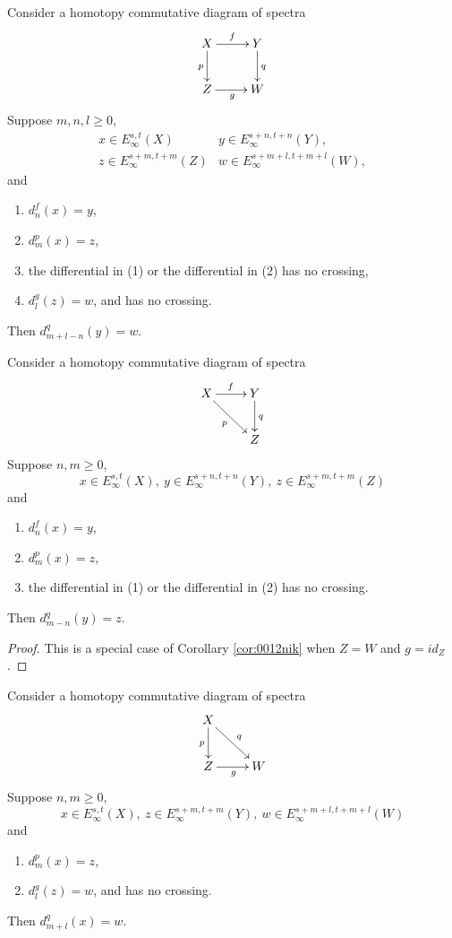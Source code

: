 \documentclass{amsart}
\numberwithin{equation}{section}
\begin{document}
\begin{corollary} \label{cor:0012nik}
    Consider a homotopy commutative diagram of spectra
    $$\xymatrix{
    X \ar[r]^{f}\ar[d]_{p} & Y\ar[d]^{q}\\
    Z \ar[r]_{g} & W
    }$$
    Suppose $m,n,l\ge 0$, 
    $$\begin{array}{ll}
        x\in E^{s,t}_\infty(X) & y\in E^{s+n,t+n}_\infty(Y),\\
        z\in E^{s+m,t+m}_\infty(Z) & w\in E^{s+m+l,t+m+l}_\infty(W),
    \end{array}$$
    and
    \begin{enumerate}
        \item $d^{f}_{n}(x)=y$,
        \item $d^{p}_{m}(x)=z$,
        \item the differential in (1) or the differential in (2) has no crossing,
        \item $d^{g}_{l}(z)=w$, and has no crossing.
    \end{enumerate}
    Then $d^{q}_{m+l-n}(y)=w$.
\end{corollary}

\begin{corollary} \label{cor:166dc180}
    Consider a homotopy commutative diagram of spectra
    $$\xymatrix{
    X \ar[r]^{f}\ar[dr]_{p} & Y\ar[d]^{q}\\
    & Z
    }$$
    Suppose $n,m\ge 0$, 
    $$x\in E^{s,t}_\infty(X), ~y\in E^{s+n,t+n}_\infty(Y), ~z\in E^{s+m,t+m}_\infty(Z)$$
    and
    \begin{enumerate}
        \item $d^{f}_{n}(x)=y$,
        \item $d^{p}_{m}(x)=z$,
        \item the differential in (1) or the differential in (2) has no crossing.
    \end{enumerate}
    Then $d^{q}_{m-n}(y)=z$.
\end{corollary}

\begin{proof}
This is a special case of Corollary \ref{cor:0012nik} when $Z=W$ and $g=id_Z$.
\end{proof}

\begin{corollary} \label{cor:290d35ce}
    Consider a homotopy commutative diagram of spectra
    $$\xymatrix{
    X \ar[d]_{p}\ar[dr]^{q} & \\
    Z\ar[r]_{g} & W
    }$$
    Suppose $n,m\ge 0$, 
    $$x\in E^{s,t}_\infty(X), ~z\in E^{s+m,t+m}_\infty(Y), ~w\in E^{s+m+l,t+m+l}_\infty(W)$$
    and
    \begin{enumerate}
        \item $d^{p}_{m}(x)=z$,
        \item $d^{g}_{l}(z)=w$, and has no crossing.
    \end{enumerate}
    Then $d^{q}_{m+l}(x)=w$.
\end{corollary}
\end{document}
